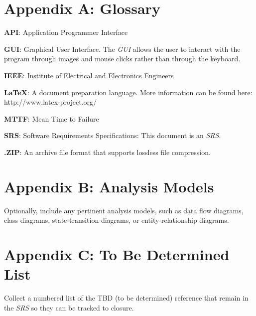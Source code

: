 \documentclass[a4paper, 12pt]{article}
\begin{document}
\section{Appendix A: Glossary} \label{sec:appendixa}
\begin{adjustwidth}{1em}{0pt}
\textbf{API}: Application Programmer Interface \newline

\noindent \textbf{GUI}: Graphical User Interface. The \textit{GUI} allows the user to interact with the program through images and mouse clicks rather than through the keyboard. \newline

\noindent \textbf{IEEE}: Institute of Electrical and Electronics Engineers \newline

\noindent \textbf{\LaTeX}: A document preparation language. More information can be found here: http://www.latex-project.org/ \newline

\noindent \textbf{MTTF}: Mean Time to Failure \newline

\noindent \textbf{SRS}: Software Requirements Specifications: This document is an \textit{SRS}. \newline

\noindent \textbf{.ZIP}: An archive file format that supports lossless file compression. \newline
\end{adjustwidth}

\section{Appendix B: Analysis Models} \label{sec:appendixb}
\begin{adjustwidth}{1em}{0pt}
Optionally, include any pertinent analysis models, such as data flow diagrams, class diagrams, state-transition diagrams, or entity-relationship diagrams.
\end{adjustwidth}

\section{Appendix C: To Be Determined List} \label{sec:appendixc}
\begin{adjustwidth}{1em}{0pt}
Collect a numbered list of the TBD (to be determined) reference that remain in the \textit{SRS} so they can be tracked to closure. 
\end{adjustwidth}
\end{document}

